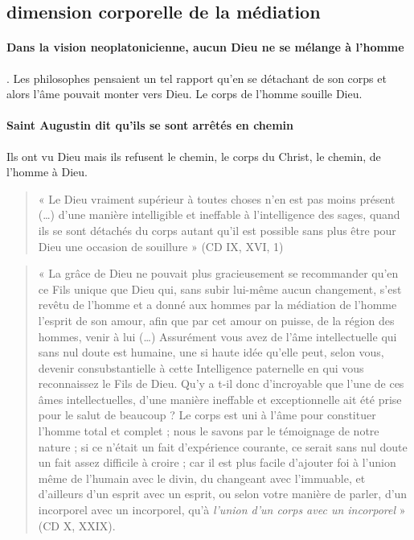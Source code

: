  \subsection{dimension corporelle de la médiation}
 
\paragraph{Dans la vision neoplatonicienne, aucun Dieu ne se mélange à l'homme}. Les philosophes pensaient un tel rapport qu'en se détachant de son corps et alors l'âme pouvait monter vers Dieu. Le corps de l'homme souille Dieu.

\paragraph{Saint Augustin dit qu'ils se sont arrêtés en chemin} Ils ont vu Dieu mais ils refusent le chemin, le corps du Christ, le chemin, de l'homme à Dieu. 

\begin{quote}
    « Le Dieu vraiment supérieur à toutes choses n’en est pas moins présent (…) d’une manière intelligible et ineffable à l’intelligence des sages, quand ils se sont détachés du corps autant qu’il est possible sans plus être pour Dieu une occasion de souillure » (CD IX, XVI, 1) 
\end{quote}


\begin{quote}
    « La grâce de Dieu ne pouvait plus gracieusement se recommander qu’en ce Fils unique que Dieu qui, sans subir lui-même aucun changement,  s’est revêtu de l’homme et a donné aux hommes par la médiation de l’homme l’esprit de son amour, afin que par cet amour on puisse, de la région des hommes, venir à lui (…) 
    Assurément vous avez de l’âme intellectuelle qui sans nul doute est humaine, une si haute idée qu’elle peut, selon vous, devenir consubstantielle à cette Intelligence paternelle en qui vous reconnaissez le Fils de Dieu. Qu’y a t-il donc d’incroyable que l’une de ces âmes intellectuelles, d’une manière ineffable et exceptionnelle ait été prise pour le salut de beaucoup ? Le corps est uni à l’âme pour constituer l’homme total et complet ; nous le savons par le témoignage de notre nature ; si ce n’était un fait d’expérience courante, ce serait sans nul doute un fait assez difficile à croire ; car il est plus facile d’ajouter foi à l’union même de l’humain avec le divin, du changeant avec l’immuable, et d’ailleurs d’un esprit avec un esprit, ou selon votre manière de parler, d’un incorporel avec un incorporel, qu’à \textit{l’union d’un corps avec un incorporel} » (CD X, XXIX). 
\end{quote}


